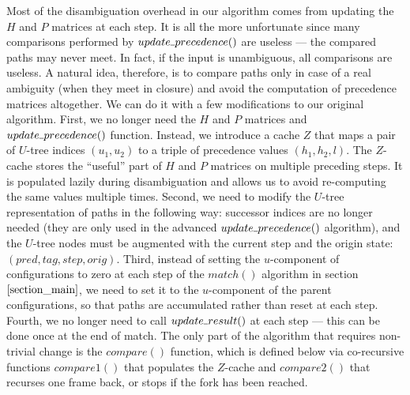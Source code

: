 \documentclass[AMA,STIX1COL]{WileyNJD-v2}
\newcommand{\Xund}{\rule{.4em}{.4pt}}
\begin{document}
Most of the disambiguation overhead in our algorithm comes from updating the $H$ and $P$ matrices at each step.
It is all the more unfortunate since many comparisons performed by $update \Xund precedence ()$ are useless ---
the compared paths may never meet.
In fact, if the input is unambiguous, all comparisons are useless.
%
A natural idea, therefore, is to compare paths only in case of a real ambiguity (when they meet in closure)
and avoid the computation of precedence matrices altogether.
%
We can do it with a few modifications to our original algorithm.
%
First, we no longer need the $H$ and $P$ matrices and $update \Xund precedence ()$ function.
Instead, we introduce a cache $Z$ that maps a pair of $U$-tree indices $(u_1, u_2)$ to a triple of precedence values $(h_1, h_2, l)$.
The $Z$-cache stores the ``useful'' part of $H$ and $P$ matrices on multiple preceding steps.
It is populated lazily during disambiguation
and allows us to avoid re-computing the same values multiple times.
%
Second, we need to modify the $U$-tree representation of paths in the following way:
successor indices are no longer needed (they are only used in the advanced $update \Xund precedence ()$ algorithm),
and the $U$-tree nodes must be augmented with the current step and the origin state: $(pred, tag, step, orig)$.
%
Third, instead of setting the $u$-component of configurations to zero at each step of the $match()$ algorithm in section $\ref{section_main}$,
we need to set it to the $u$-component of the parent configurations,
so that paths are accumulated rather than reset at each step.
%
Fourth, we no longer need to call $update \Xund result ()$ at each step --- this can be done once at the end of match.
%
The only part of the algorithm that requires non-trivial change is the $compare()$ function, which is defined below
via co-recursive functions $compare1()$ that populates the $Z$-cache and $compare2()$ that recurses one frame back, or stops if the fork has been reached.

\medskip
\end{document}
